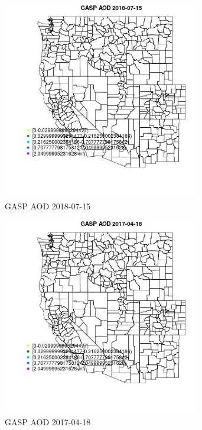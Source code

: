 \begin{figure} 
\centering  
\includegraphics[width=0.77\textwidth]{Code_Outputs/Report_ML_input_PM25_Step4_part_e_de_duplicated_aves_compiled_2019-05-21wNAs_MapObsGASP_AOD2018-07-15.jpg} 
\caption{\label{fig:Report_ML_input_PM25_Step4_part_e_de_duplicated_aves_compiled_2019-05-21wNAsMapObsGASP_AOD2018-07-15}GASP AOD 2018-07-15} 
\end{figure} 
 

\begin{figure} 
\centering  
\includegraphics[width=0.77\textwidth]{Code_Outputs/Report_ML_input_PM25_Step4_part_e_de_duplicated_aves_compiled_2019-05-21wNAs_MapObsGASP_AOD2017-04-18.jpg} 
\caption{\label{fig:Report_ML_input_PM25_Step4_part_e_de_duplicated_aves_compiled_2019-05-21wNAsMapObsGASP_AOD2017-04-18}GASP AOD 2017-04-18} 
\end{figure} 
 

